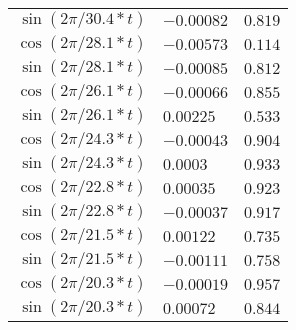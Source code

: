 \begin{tabular}{r|ll}
 $\sin(2\pi/30.4 * t)$  & $-0.00082$    & $0.819$   \\
 $\cos(2\pi/28.1 * t)$  & $-0.00573$    & $0.114$   \\
 $\sin(2\pi/28.1 * t)$  & $-0.00085$    & $0.812$   \\
 $\cos(2\pi/26.1 * t)$  & $-0.00066$    & $0.855$   \\
 $\sin(2\pi/26.1 * t)$  & $0.00225$     & $0.533$   \\
 $\cos(2\pi/24.3 * t)$  & $-0.00043$    & $0.904$   \\
 $\sin(2\pi/24.3 * t)$  & $0.0003$      & $0.933$   \\
 $\cos(2\pi/22.8 * t)$  & $0.00035$     & $0.923$   \\
 $\sin(2\pi/22.8 * t)$  & $-0.00037$    & $0.917$   \\
 $\cos(2\pi/21.5 * t)$  & $0.00122$     & $0.735$   \\
 $\sin(2\pi/21.5 * t)$  & $-0.00111$    & $0.758$   \\
 $\cos(2\pi/20.3 * t)$  & $-0.00019$    & $0.957$   \\
 $\sin(2\pi/20.3 * t)$  & $0.00072$     & $0.844$   \\
\hline
\end{tabular}